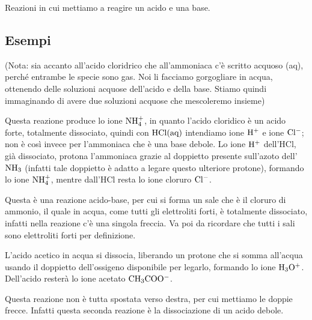 Reazioni in cui mettiamo a reagire un acido e una base.
\subsection{Esempi}

\vspace{0.2cm}(Nota: sia accanto all'acido cloridrico che all'ammoniaca c'è scritto acquoso (aq), perché entrambe le specie sono gas. Noi li facciamo gorgogliare in acqua, ottenendo delle soluzioni acquose dell'acido e della base. Stiamo quindi immaginando di avere due soluzioni acquose che mescoleremo insieme)

Questa reazione produce lo ione $\rm NH_4^+$, in quanto l'acido cloridico è un acido forte, totalmente dissociato, quindi con $\rm HCl(aq)$ intendiamo ione $\rm H^+$ e ione $\rm Cl^-$; non è così invece per l'ammoniaca che è una base debole. Lo ione $\rm H^+$ dell'HCl, già dissociato, protona l'ammoniaca grazie al doppietto presente sull'azoto dell'$\rm NH_3$ (infatti tale doppietto è adatto a legare questo ulteriore protone), formando lo ione $\rm NH_4^+$, mentre dall'HCl resta lo ione cloruro $\rm Cl^-$.

Questa è una reazione acido-base, per cui si forma un sale che è il cloruro di ammonio, il quale in acqua, come tutti gli elettroliti forti, è totalmente dissociato, infatti nella reazione c'è una singola freccia. Va poi da ricordare che tutti i sali sono elettroliti forti per definizione.

\vspace{0.2cm}

\vspace{0.2cm}L'acido acetico in acqua si dissocia, liberando un protone che si somma all'acqua usando il doppietto dell'ossigeno disponibile per legarlo, formando lo ione $\rm H_3O^+$. Dell'acido resterà lo ione acetato $\rm CH_3COO^-$.

Questa reazione non è tutta spostata verso destra, per cui mettiamo le doppie frecce. Infatti questa seconda reazione è la dissociazione di un acido debole.

\vspace{0.2cm}


